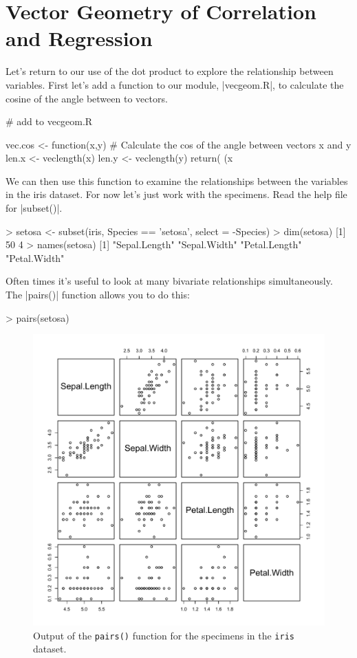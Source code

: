

\section{Vector Geometry of Correlation and Regression}

Let's return to our use of the dot product to explore the relationship between variables. First let's add a function to our module, |vecgeom.R|, to calculate the cosine of the angle between to vectors.
\begin{R}
# add to vecgeom.R

vec.cos <- function(x,y) {
  # Calculate the cos of the angle between vectors x and y
  len.x <- veclength(x)
  len.y <- veclength(y)
  return( (x %
}
\end{R}


We can then use this function to examine the relationships between the variables in the iris dataset. For now let's just work with the  specimens. Read the help file for |subset()|.
\begin{R}
> setosa <- subset(iris, Species == 'setosa', select = -Species)
> dim(setosa)
[1] 50  4
> names(setosa)
[1] "Sepal.Length" "Sepal.Width"  "Petal.Length" "Petal.Width"
\end{R}
%
Often times it's useful to look at many bivariate relationships simultaneously. The |pairs()| function allows you to do this:
%
\begin{R}
> pairs(setosa)
\end{R}
%
\begin{figure}[htbp]
\centering
\includegraphics[width=0.5\columnwidth]{./figures/hands-on2/pairs-output.pdf}
\caption{Output of the \lstinline!pairs()! function for the  specimens in the \lstinline|iris| dataset.}
\end{figure}


